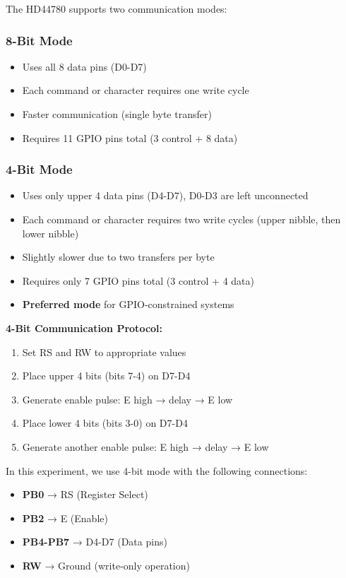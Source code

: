 The HD44780 supports two communication modes:

\subsubsection{8-Bit Mode}
\begin{itemize}[nosep]
  \item Uses all 8 data pins (D0-D7)
  \item Each command or character requires one write cycle
  \item Faster communication (single byte transfer)
  \item Requires 11 GPIO pins total (3 control + 8 data)
\end{itemize}

\subsubsection{4-Bit Mode}
\begin{itemize}[nosep]
  \item Uses only upper 4 data pins (D4-D7), D0-D3 are left unconnected
  \item Each command or character requires two write cycles (upper nibble, then lower nibble)
  \item Slightly slower due to two transfers per byte
  \item Requires only 7 GPIO pins total (3 control + 4 data)
  \item \textbf{Preferred mode} for GPIO-constrained systems
\end{itemize}

\noindent
\textbf{4-Bit Communication Protocol:}
\begin{enumerate}[nosep]
  \item Set RS and RW to appropriate values
  \item Place upper 4 bits (bits 7-4) on D7-D4
  \item Generate enable pulse: E high → delay → E low
  \item Place lower 4 bits (bits 3-0) on D7-D4
  \item Generate another enable pulse: E high → delay → E low
\end{enumerate}

\noindent
In this experiment, we use 4-bit mode with the following connections:
\begin{itemize}[nosep]
  \item \textbf{PB0} → RS (Register Select)
  \item \textbf{PB2} → E (Enable)
  \item \textbf{PB4-PB7} → D4-D7 (Data pins)
  \item \textbf{RW} → Ground (write-only operation)
\end{itemize}

